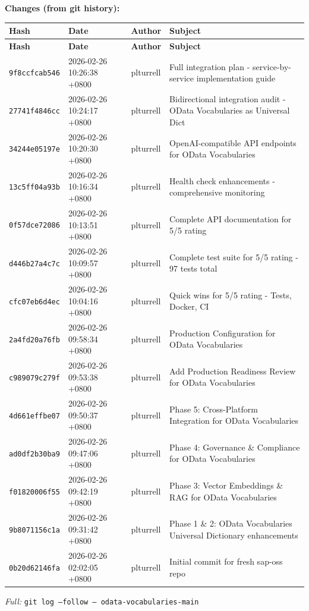 \documentclass[11pt,a4paper]{article}
\begin{document}
\textbf{Changes (from git history):}
\begin{longtable}{|p{2.2cm}|p{3.2cm}|l|p{6cm}|}
\hline \textbf{Hash} & \textbf{Date} & \textbf{Author} & \textbf{Subject} \\ \hline \endfirsthead
\hline \textbf{Hash} & \textbf{Date} & \textbf{Author} & \textbf{Subject} \\ \hline \endhead
\texttt{9f8ccfcab546} & 2026-02-26 10:26:38 +0800 & plturrell & Full integration plan - service-by-service implementation guide \\
\texttt{27741f4846cc} & 2026-02-26 10:24:17 +0800 & plturrell & Bidirectional integration audit - OData Vocabularies as Universal Dict \\
\texttt{34244e05197e} & 2026-02-26 10:20:30 +0800 & plturrell & OpenAI-compatible API endpoints for OData Vocabularies \\
\texttt{13c5ff04a93b} & 2026-02-26 10:16:34 +0800 & plturrell & Health check enhancements - comprehensive monitoring \\
\texttt{0f57dce72086} & 2026-02-26 10:13:51 +0800 & plturrell & Complete API documentation for 5/5 rating \\
\texttt{d446b27a4c7c} & 2026-02-26 10:09:57 +0800 & plturrell & Complete test suite for 5/5 rating - 97 tests total \\
\texttt{cfc07eb6d4ec} & 2026-02-26 10:04:16 +0800 & plturrell & Quick wins for 5/5 rating - Tests, Docker, CI \\
\texttt{2a4fd20a76fb} & 2026-02-26 09:58:34 +0800 & plturrell & Production Configuration for OData Vocabularies \\
\texttt{c989079c279f} & 2026-02-26 09:53:38 +0800 & plturrell & Add Production Readiness Review for OData Vocabularies \\
\texttt{4d661effbe07} & 2026-02-26 09:50:37 +0800 & plturrell & Phase 5: Cross-Platform Integration for OData Vocabularies \\
\texttt{ad0df2b30ba9} & 2026-02-26 09:47:06 +0800 & plturrell & Phase 4: Governance \& Compliance for OData Vocabularies \\
\texttt{f01820006f55} & 2026-02-26 09:42:19 +0800 & plturrell & Phase 3: Vector Embeddings \& RAG for OData Vocabularies \\
\texttt{9b8071156c1a} & 2026-02-26 09:31:42 +0800 & plturrell & Phase 1 \& 2: OData Vocabularies Universal Dictionary enhancements \\
\texttt{0b20d62146fa} & 2026-02-26 02:02:05 +0800 & plturrell & Initial commit for fresh sap-oss repo \\
\hline
\end{longtable}
\textit{Full:} \texttt{git log --follow -- odata-vocabularies-main}
\end{document}
